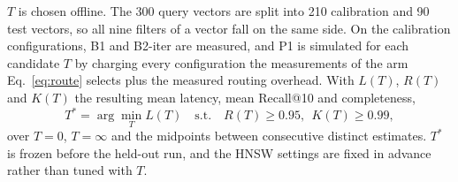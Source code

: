 $T$ is chosen offline. The 300 query vectors are split into 210 calibration and 90 test vectors, so all nine filters
of a vector fall on the same side. On the calibration configurations, B1 and B2-iter are measured, and P1 is simulated
for each candidate $T$ by charging every configuration the measurements of the arm Eq.~\eqref{eq:route} selects plus
the measured routing overhead. With $L(T)$, $R(T)$ and $K(T)$ the resulting mean latency, mean Recall@10 and
completeness,
\begin{equation}
T^{*}=\arg\min_{T} L(T)\quad\text{s.t.}\quad R(T)\ge0.95,\ \ K(T)\ge0.99,
\label{eq:calib}
\end{equation}
over $T=0$, $T=\infty$ and the midpoints between consecutive distinct estimates. $T^{*}$ is frozen before the held-out
run, and the HNSW settings are fixed in advance rather than tuned with $T$.

